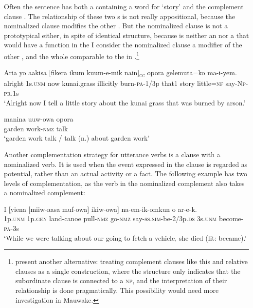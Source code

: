 Often the sentence has both a  containing a word for `story' and the complement clause . The relationship of these two s is not really appositional, because the nominalized clause modifies the other . But the nominalized clause is not a prototypical  either, in spite of identical structure, because  is neither an  nor a  that would have a function in the  I consider the nominalized clause a modifier of the other , and the whole comparable to the  in .\footnote{\citet{ComrieEtAl1995} present another alternative: treating complement clauses like this and relative clauses as a single construction, where the structure only indicates that the subordinate clause is connected to a \textsc{np}, and the interpretation of their relationship is done pragmatically. This possibility would need more investigation in Mauwake.} 

\ea%
\label{ex:8:x1594}
\gll Aria  yo  aakisa  [fikera  ikum  kuum-e-mik  nain]\textsubscript{\textsc{cc}} opora  gelemuta=ko  ma-i-yem.\\
alright  1s.\textsc{unm} now  kunai.grass  illicitly  burn-\textsc{pa}-1/3p  that1 story  little=\textsc{nf} say-\textsc{Np}-\textsc{pr}.1s\\
\glt`Alright now I tell a little story about the kunai grass that was burned by arson.'
\z


\ea%
\label{ex:8:x1598}
\gll manina  uuw-owa  opora \\
garden  work-\textsc{nmz} talk\\
\glt`garden work talk / talk (n.) about garden work'
\z


Another complementation strategy for utterance verbs is a clause with a nominalized verb. It is used when the event expressed in the clause is regarded as potential, rather than an actual activity or a fact. The following example has two levels of complementation, as the verb in the nominalized complement also takes a nominalized complement:

\ea%
\label{ex:8:x1599}
\gll I  [yiena  [miiw-aasa  muf-owa]  ikiw-owa] na-em-ik-omkun  o  ar-e-k. \\
1p.\textsc{unm} 1p.\textsc{gen} land-canoe pull-\textsc{nmz} go-\textsc{nmz} say-\textsc{ss}.\textsc{sim}-be-2/3p.\textsc{ds} 3s.\textsc{unm} become-\textsc{pa}-3s\\
\glt`While we were talking about our going to fetch a vehicle, she died (lit: became).'
\z


